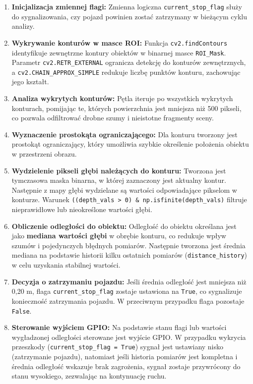 \documentclass[magisterska]{pracadypl}
\begin{document}
\begin{enumerate}
    \item \textbf{Inicjalizacja zmiennej flagi:}
    Zmienna logiczna \texttt{current\_stop\_flag} służy do sygnalizowania, czy pojazd powinien zostać zatrzymany w bieżącym cyklu analizy.

    \item \textbf{Wykrywanie konturów w masce ROI:}
    Funkcja \texttt{cv2.findContours} identyfikuje zewnętrzne kontury obiektów w binarnej masce \texttt{ROI\_Mask}. Parametr \texttt{cv2.RETR\_EXTERNAL} ogranicza detekcję do konturów zewnętrznych, a \texttt{cv2.CHAIN\_APPROX\_SIMPLE} redukuje liczbę punktów konturu, zachowując jego kształt.

    \item \textbf{Analiza wykrytych konturów:}
    Pętla iteruje po wszystkich wykrytych konturach, pomijając te, których powierzchnia jest mniejsza niż 500 pikseli, co pozwala odfiltrować drobne szumy i nieistotne fragmenty sceny.

    \item \textbf{Wyznaczenie prostokąta ograniczającego:}
    Dla konturu tworzony jest prostokąt ograniczający, który umożliwia szybkie określenie położenia obiektu w przestrzeni obrazu.

    \item \textbf{Wydzielenie pikseli głębi należących do konturu:}
      Tworzona jest tymczasowa maska binarna, w której zaznaczony jest aktualny kontur. Następnie z mapy głębi wydzielane są wartości odpowiadające pikselom w konturze. Warunek \texttt{((depth\_vals > 0) \& np.isfinite(depth\_vals)} filtruje nieprawidłowe lub nieokreślone wartości głębi.

    \item \textbf{Obliczenie odległości do obiektu:}
      Odległość do obiektu określana jest jako \textbf{mediana wartości głębi} w obrębie konturu, co redukuje wpływ szumów i pojedynczych błędnych pomiarów. Następnie tworzona jest średnia mediana na podstawie historii kilku ostatnich pomiarów (\texttt{distance\_history}) w celu uzyskania stabilnej wartości.

    \item \textbf{Decyzja o zatrzymaniu pojazdu:}
    Jeśli średnia odległość jest mniejsza niż 0,20 m, flaga \texttt{current\_stop\_flag} zostaje ustawiona na \texttt{True}, co sygnalizuje konieczność zatrzymania pojazdu. W przeciwnym przypadku flaga pozostaje \texttt{False}.

    \item \textbf{Sterowanie wyjściem GPIO:}
    Na podstawie stanu flagi lub wartości wygładzonej odległości sterowane jest wyjście GPIO. W przypadku wykrycia przeszkody (\texttt{current\_stop\_flag = True}) sygnał jest ustawiany nisko (zatrzymanie pojazdu), natomiast jeśli historia pomiarów jest kompletna i średnia odległość wskazuje brak zagrożenia, sygnał zostaje przywrócony do stanu wysokiego, zezwalając na kontynuację ruchu.
\end{enumerate}
\end{document}
